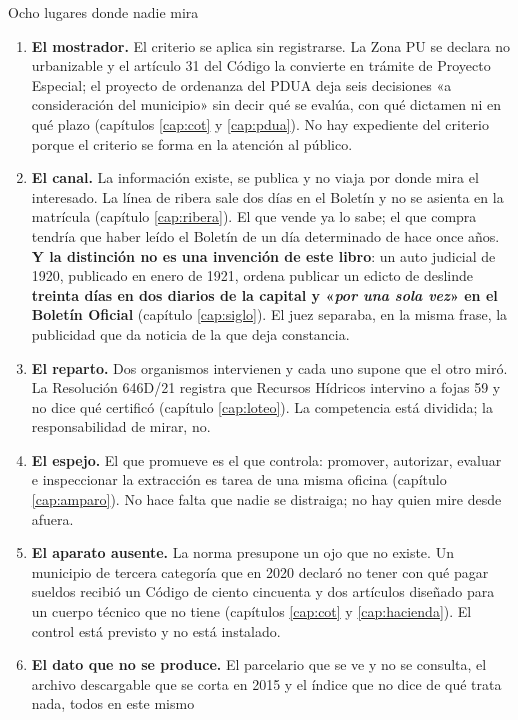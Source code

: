\begin{ficha}{Ocho lugares donde nadie mira}
\begin{enumerate}[leftmargin=*,nosep]
\item \textbf{El mostrador.} El criterio se aplica sin registrarse. La Zona PU se declara no
urbanizable y el artículo 31 del Código la convierte en trámite de Proyecto Especial; el
proyecto de ordenanza del PDUA deja seis decisiones «a consideración del municipio» sin decir
qué se evalúa, con qué dictamen ni en qué plazo (capítulos \ref{cap:cot} y \ref{cap:pdua}). No
hay expediente del criterio porque el criterio se forma en la atención al público.
\item \textbf{El canal.} La información existe, se publica y no viaja por donde mira el
interesado. La línea de ribera sale dos días en el Boletín y no se asienta en la matrícula
(capítulo \ref{cap:ribera}). El que vende ya lo sabe; el que compra tendría que haber leído el
Boletín de un día determinado de hace once años. \textbf{Y la distinción no es una invención de
este libro}: un auto judicial de 1920, publicado en enero de 1921, ordena publicar un edicto de
deslinde \textbf{treinta días en dos diarios de la capital y «\textit{por una sola vez}» en el
Boletín Oficial} (capítulo \ref{cap:siglo}). El juez separaba, en la misma frase, la publicidad
que da noticia de la que deja constancia.
\item \textbf{El reparto.} Dos organismos intervienen y cada uno supone que el otro miró. La
Resolución 646D/21 registra que Recursos Hídricos intervino a fojas 59 y no dice qué certificó
(capítulo \ref{cap:loteo}). La competencia está dividida; la responsabilidad de mirar, no.
\item \textbf{El espejo.} El que promueve es el que controla: promover, autorizar, evaluar e
inspeccionar la extracción es tarea de una misma oficina (capítulo \ref{cap:amparo}). No hace
falta que nadie se distraiga; no hay quien mire desde afuera.
\item \textbf{El aparato ausente.} La norma presupone un ojo que no existe. Un municipio de
tercera categoría que en 2020 declaró no tener con qué pagar sueldos recibió un Código de
ciento cincuenta y dos artículos diseñado para un cuerpo técnico que no tiene (capítulos
\ref{cap:cot} y \ref{cap:hacienda}). El control está previsto y no está instalado.
\item \textbf{El dato que no se produce.} El parcelario que se ve y no se consulta, el archivo
descargable que se corta en 2015 y el índice que no dice de qué trata nada, todos en este mismo

\end{enumerate}
\end{ficha}
